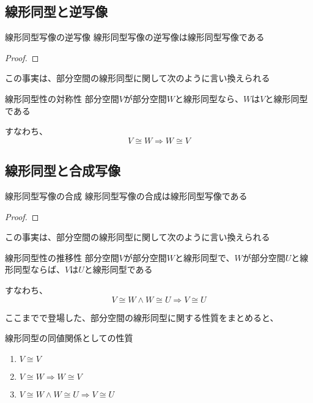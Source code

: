 \documentclass[../../../topic_linear-algebra]{subfiles}
\begin{document}
\subsection{線形同型と逆写像}

\begin{theorem}{線形同型写像の逆写像}
  線形同型写像の逆写像は線形同型写像である
\end{theorem}

\begin{proof}
\end{proof}

この事実は、部分空間の線形同型に関して次のように言い換えられる

\begin{theorem}{線形同型性の対称性}
  部分空間$V$が部分空間$W$と線形同型なら、$W$は$V$と線形同型である

  すなわち、
  \begin{equation*}
    V \cong W \Longrightarrow W \cong V
  \end{equation*}
\end{theorem}

\subsection{線形同型と合成写像}

\begin{theorem}{線形同型写像の合成}
  線形同型写像の合成は線形同型写像である
\end{theorem}

\begin{proof}
\end{proof}

この事実は、部分空間の線形同型に関して次のように言い換えられる

\begin{theorem}{線形同型性の推移性}
  部分空間$V$が部分空間$W$と線形同型で、$W$が部分空間$U$と線形同型ならば、$V$は$U$と線形同型である

  すなわち、
  \begin{equation*}
    V \cong W \land W \cong U \Longrightarrow V \cong U
  \end{equation*}
\end{theorem}

\sectionline

ここまでで登場した、部分空間の線形同型に関する性質をまとめると、

\begin{theorem}{線形同型の同値関係としての性質}
  \begin{enumerate}[label=\romanlabel]
    \item $V \cong V$
    \item $V \cong W \Longrightarrow W \cong V$
    \item $V \cong W \land W \cong U \Longrightarrow V \cong U$
  \end{enumerate}
\end{theorem}
\end{document}
